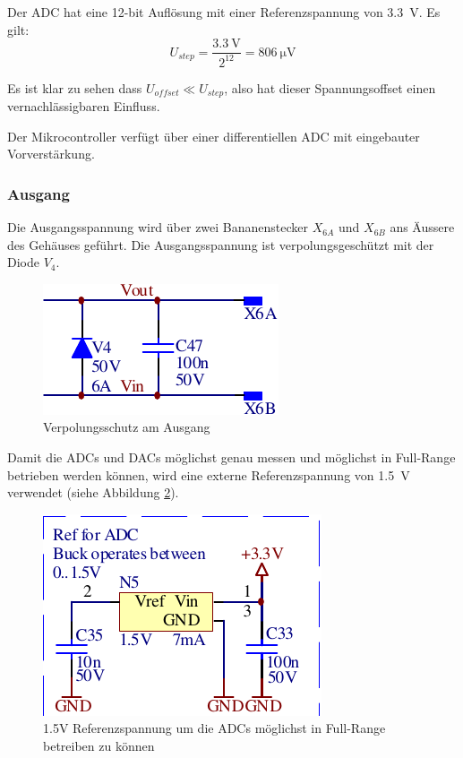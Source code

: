 Der ADC hat eine 12-bit Aufl\"osung mit einer Referenzspannung von \SI{3.3}{\volt}. Es gilt:
\begin{equation}
    U_{step} = \frac{\SI{3.3}{\volt}}{2^{12}} = \SI{806}{\micro\volt}
\end{equation}

Es  ist  klar  zu  sehen  dass  $U_{offset}  \ll  U_{step}$,  also   hat  dieser
Spannungsoffset einen vernachl\"assigbaren Einfluss.

Der  Mikrocontroller verf\"ugt \"uber einer differentiellen ADC mit  eingebauter
Vorverst\"arkung.

\subsubsection*{Ausgang}

Die Ausgangsspannung wird \"uber zwei  Bananenstecker  $X_{6A}$ und $X_{6B}$ ans
\"Aussere    des    Geh\"auses     gef\"uhrt.     Die    Ausgangsspannung    ist
verpolungsgesch\"utzt mit der Diode $V_4$.

\begin{figure}[th!]
    \center
    \includegraphics[width=.35\textwidth]{images/circuit/output-connectors.pdf}
    \caption{Verpolungsschutz am Ausgang}
    \label{fig:circuit:output}
\end{figure}

Damit die ADCs und DACs  m\"oglichst  genau messen und m\"oglichst in Full-Range
betrieben    werden   k\"onnen,   wird   eine   externe   Referenzspannung   von
\SI{1.5}{\volt}    verwendet     (siehe    Abbildung    \ref{fig:circuit:vref}).

\begin{figure}[th!]
    \center
    \includegraphics[width=.4\textwidth]{images/circuit/vref.pdf}
    \caption{1.5V Referenzspannung um die ADCs m\"oglichst in Full-Range betreiben zu k\"onnen}
    \label{fig:circuit:vref}
\end{figure}

